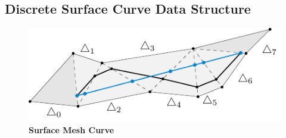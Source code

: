 \documentclass{stdlocal}
\begin{document}

\subsection{Discrete Surface Curve Data Structure} %
\label{sub:discrete_surface_curve_data_structure}

  \begin{figure}
    \centering
    \includegraphics[width=0.8\linewidth]{figures/surface-mesh-curve.pdf}
    \caption[Surface Mesh Curve]{%
      \textbf{Surface Mesh Curve}\\
    }
  \end{figure}
\end{document}
